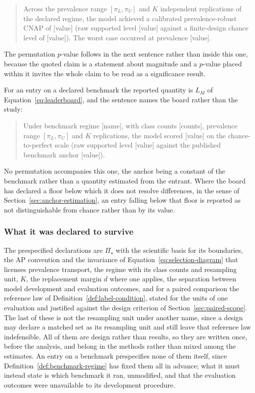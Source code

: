 \documentclass[11pt]{article}
\newcommand{\PSet}{\Pi_\star}
\theoremstyle{remark}
\begin{document}
\begin{quote}
Across the prevalence range $[\pi_L,\pi_U]$ and $K$ independent replications of the declared regime, the model achieved a calibrated prevalence-robust CNAP of [value] (raw supported level [value] against a finite-design chance level of [value]). The worst case occurred at prevalence [value].
\end{quote}

The permutation $p$-value follows in the next sentence rather than inside this one, because the quoted claim is a statement about magnitude and a $p$-value placed within it invites the whole claim to be read as a significance result.

For an entry on a declared benchmark the reported quantity is $L_M$ of Equation~\eqref{eq:leaderboard}, and the sentence names the board rather than the study:

\begin{quote}
Under benchmark regime [name], with class counts [counts], prevalence range $[\pi_L,\pi_U]$ and $K$ replications, the model scored [value] on the chance-to-perfect scale (raw supported level [value] against the published benchmark anchor [value]).
\end{quote}

No permutation accompanies this one, the anchor being a constant of the benchmark rather than a quantity estimated from the entrant. Where the board has declared a floor below which it does not resolve differences, in the sense of Section~\ref{sec:anchor-estimation}, an entry falling below that floor is reported as not distinguishable from chance rather than by its value.

\subsubsection*{What it was declared to survive}

The prespecified declarations are $\PSet$ with the scientific basis for its boundaries, the AP convention and the invariance of Equation~\eqref{eq:selection-diagram} that licenses prevalence transport, the regime with its class counts and resampling unit, $K$, the replacement margin $d$ where one applies, the separation between model development and evaluation outcomes, and for a paired comparison the reference law of Definition~\ref{def:label-condition}, stated for the units of one evaluation and justified against the design criterion of Section~\ref{sec:paired-scope}. The last of these is not the resampling unit under another name, since a design may declare a matched set as its resampling unit and still leave that reference law indefensible. All of them are design rather than results, so they are written once, before the analysis, and belong in the methods rather than mixed among the estimates. An entry on a benchmark prespecifies none of them itself, since Definition~\ref{def:benchmark-regime} has fixed them all in advance; what it must instead state is which benchmark it ran, unmodified, and that the evaluation outcomes were unavailable to its development procedure.
\end{document}
